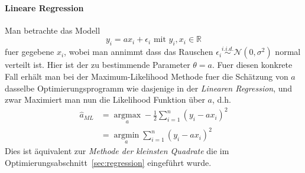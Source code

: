 \paragraph{Lineare Regression} 
Man betrachte das Modell
\begin{equation*} 
y_{i} = ax_{i}+\epsilon_{i} \text{ mit } y_{i}, x_{i} \in \mathbb{R}
\end{equation*}
fuer gegebene $x_i$, wobei man annimmt dass das Rauschen $\epsilon_i \overset{i.i.d.}{\sim} \mathcal{N}(0,\sigma^2)$ normal verteilt ist. Hier ist der zu bestimmende Parameter $\theta = a$. Fuer diesen konkrete Fall erh\"alt man bei der Maximum-Likelihood Methode fuer die Sch\"atzung von $a$ dasselbe Optimierungsprogramm wie dasjenige in der \textit{Linearen Regression}, und zwar 
Maximiert man nun die Likelihood Funktion \"uber $a$, d.h.
\begin{align*}
\hat{a}_{ML} &= \underset{a}{\operatorname{argmax}} -\frac{1}{2} \sum_{i=1}^{n} (y_{i} -ax_{i})^{2}\\
&= \underset{a}{\operatorname{argmin}} \sum_{i=1}^n (y_i - ax_i)^2
\end{align*}
Dies ist \"aquivalent zur \textit{Methode der kleinsten Quadrate} die im Optimierungsabschnitt~\ref{sec:regression} eingef\"uhrt wurde.
